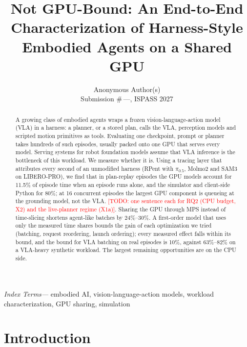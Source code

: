 \documentclass[conference,10pt]{IEEEtran}
\newcommand{\IEEEauthorblockN}[1]{#1}
\newcommand{\IEEEauthorblockA}[1]{\\#1}
\newenvironment{IEEEkeywords}{\par\smallskip\noindent\textit{Index Terms---}}{\par}
\newcommand{\pct}[1]{#1\%}
\newcommand{\num}[1]{#1}                        %
\newcommand{\todo}[1]{\textcolor{red}{[TODO: #1]}}
\begin{document}
\title{Not GPU-Bound: An End-to-End Characterization of Harness-Style Embodied Agents on a Shared GPU}

\author{\IEEEauthorblockN{Anonymous Author(s)}\IEEEauthorblockA{Submission \#\,---, ISPASS 2027}}

\maketitle

\begin{abstract}
A growing class of embodied agents wraps a frozen vision-language-action model (VLA) in a
harness: a planner, or a stored plan, calls the VLA, perception models and scripted motion
primitives as tools. Evaluating one checkpoint, prompt or planner takes hundreds of such
episodes, usually packed onto one GPU that serves every model. Serving systems for robot
foundation models assume that VLA inference is the bottleneck of this workload. We measure
whether it is. Using a tracing layer that attributes every second of an unmodified harness
(RPent with $\pi_{0.5}$, Molmo2 and SAM3 on LIBERO-PRO), we find that in plan-replay episodes
the GPU models account for \pct{\num{11.5}} of episode time when an episode runs alone, and
the simulator and client-side Python for \pct{\num{80}}; at 16 concurrent episodes the largest
GPU component is queueing at the grounding model, not the VLA. \todo{one sentence each for
RQ2 (CPU budget, X2) and the live-planner regime (X1a)}. Sharing the GPU through MPS instead
of time-slicing shortens agent-like batches by \pct{24}--\pct{30}. A first-order model that
uses only the measured time shares bounds the gain of each optimization we tried (batching,
request reordering, launch ordering); every measured effect falls within its bound, and the
bound for VLA batching on real episodes is \pct{10}, against \pct{63}--\pct{82} on a
VLA-heavy synthetic workload. The largest remaining opportunities are on the CPU side.
\end{abstract}

\begin{IEEEkeywords}
embodied AI, vision-language-action models, workload characterization, GPU sharing, simulation
\end{IEEEkeywords}

\section{Introduction}
\end{document}
